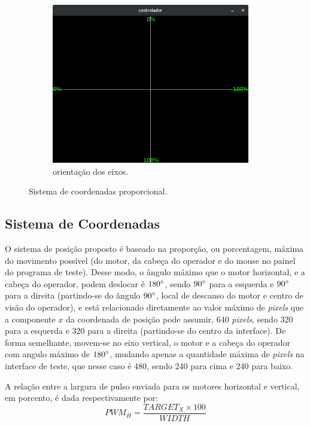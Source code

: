 \begin{figure}[H]
	\begin{subfigure}{.5\textwidth}
		\includegraphics[width=0.95\textwidth]{figuras/controlador-values.jpg}
		\caption{orientação dos eixos.}
		\label{fig:sistcoord}
	\end{subfigure}
	\caption{Sistema de coordenadas proporcional.}
\end{figure}

\subsection{Sistema de Coordenadas}
\label{subsec:sistemacoordenadas}

O sistema de posição proposto é baseado na proporção, ou porcentagem, máxima do movimento possível (do motor, da cabeça do operador e do mouse no painel do programa de teste). Desse modo, o ângulo máximo que o motor horizontal, e a cabeça do operador, podem deslocar é $180\degree$, sendo $90\degree$ para a esquerda e $90\degree$ para a direita (partindo-se do ângulo $90\degree$, local de descanso do motor e centro de visão do operador), e está relacionado diretamente ao valor máximo de \textit{pixels} que a componente $x$ da coordenada de posição pode assumir, 640 \textit{pixels}, sendo 320 para a esquerda e 320 para a direita (partindo-se do centro da interface). De forma semelhante, movem-se no eixo vertical, o motor e a cabeça do operador com angulo máximo de $180\degree$, mudando apenas a quantidade máxima de \textit{pixels} na interface de teste, que nesse caso é 480, sendo 240 para cima e 240 para baixo.\par
A relação entre a largura de pulso enviada para os motores horizontal e vertical, em porcento, é dada respectivamente por:
\begin{equation}
	PWM_H = \frac{TARGET_X \times 100}{WIDTH}
	\label{eq:pwm_screen_h}
\end{equation}

